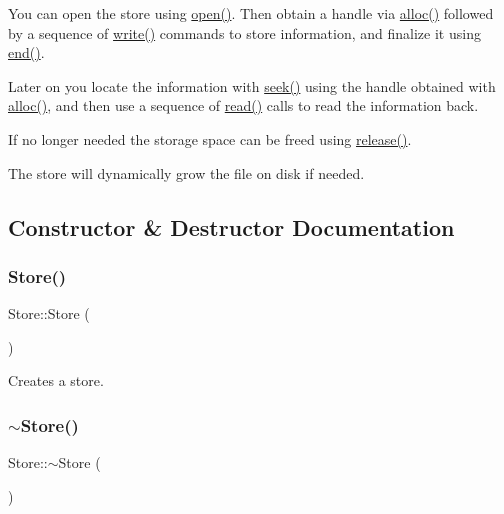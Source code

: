 You can open the store using \mbox{\hyperlink{class_store_a9707050019d12be2db8ea1b38d535f03}{open()}}. Then obtain a handle via \mbox{\hyperlink{class_store_ac1ce3fb86b3bc46125756b9ef782c095}{alloc()}} followed by a sequence of \mbox{\hyperlink{class_store_aec754c74cf190cb55281a923db21194a}{write()}} commands to store information, and finalize it using \mbox{\hyperlink{class_store_a616a1f53fa04d39d505a03b1f49ab7a6}{end()}}.

Later on you locate the information with \mbox{\hyperlink{class_store_ad77053023f371abfc70f76ee2a14c377}{seek()}} using the handle obtained with \mbox{\hyperlink{class_store_ac1ce3fb86b3bc46125756b9ef782c095}{alloc()}}, and then use a sequence of \mbox{\hyperlink{class_store_a02df7a98367838e436f8f8b3367016d1}{read()}} calls to read the information back.

If no longer needed the storage space can be freed using \mbox{\hyperlink{class_store_aed5b8a83aa15dfc3f7f1ca930a4d2583}{release()}}.

The store will dynamically grow the file on disk if needed. 

\subsection{Constructor \& Destructor Documentation}
\mbox{\label{class_store_a5f58eadcb7385d5a5aa6830daef84f7d}} 
\subsubsection{\texorpdfstring{Store()}{Store()}}
{\footnotesize\ttfamily Store\+::\+Store (\begin{DoxyParamCaption}{ }\end{DoxyParamCaption})}

Creates a store. \mbox{\label{class_store_a4fd725fdb2de0632ed98bfbd131c2512}} 
\subsubsection{\texorpdfstring{$\sim$Store()}{~Store()}}
{\footnotesize\ttfamily Store\+::$\sim$\+Store (\begin{DoxyParamCaption}{ }\end{DoxyParamCaption})}

